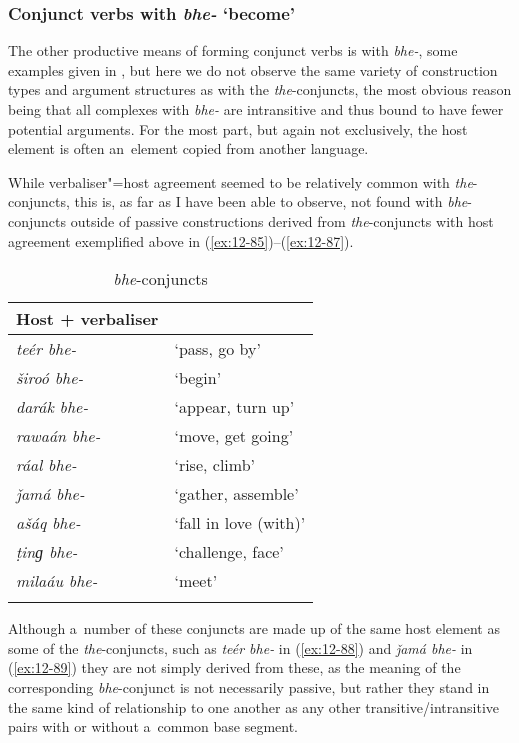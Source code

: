 \subsubsection*{Conjunct verbs with \textit{bhe-} `become'}

The other productive means of forming conjunct verbs is with \textit{bhe-}, some examples given in , but here we do not observe the same variety of construction types and argument structures as with the \textit{the}-conjuncts, the most obvious reason being that all complexes with \textit{bhe-} are intransitive and thus bound to have fewer potential arguments. For the most part, but again not exclusively, the host element is often an~element copied from another language. 


While verbaliser"=host agreement seemed to be relatively common with \textit{the}-conjuncts, this is, as far as I have been able to observe, not found with \textit{bhe}-conjuncts outside of passive constructions derived from \textit{the}-conjuncts with host agreement exemplified above in (\ref{ex:12-85})--(\ref{ex:12-87}). 


\begin{table}[ht]
\caption{\textit{bhe}-conjuncts}
\begin{tabularx}{.75\textwidth}{ l@{\hspace{45pt}} Q }
\lsptoprule
Host + verbaliser &
\\\hline
\textit{teér bhe-} &
`pass, go by'\\
\textit{široó bhe-} &
`begin'\\
\textit{darák bhe-} &
`appear, turn up'\\
\textit{rawaán bhe-} &
`move, get going'\\
\textit{ráal bhe-} &
`rise, climb'\\
\textit{ǰamá bhe-} &
`gather, assemble'\\
\textit{ašáq bhe-} &
`fall in love (with)'\\
\textit{ṭinɡ bhe-} &
`challenge, face'\\
\textit{milaáu bhe-} &
`meet'\\\lspbottomrule
\end{tabularx}
\label{tab:12-6}
\end{table}


Although a~number of these conjuncts are made up of the same host element as some of the \textit{the}-conjuncts, such as \textit{teér bhe-} in (\ref{ex:12-88}) and \textit{ǰamá bhe-} in (\ref{ex:12-89}) they are not simply derived from these, as the meaning of the corresponding \textit{bhe}-conjunct is not necessarily passive, but rather they stand in the same kind of relationship to one another as any other transitive/intransitive pairs with or without a~common base segment.

